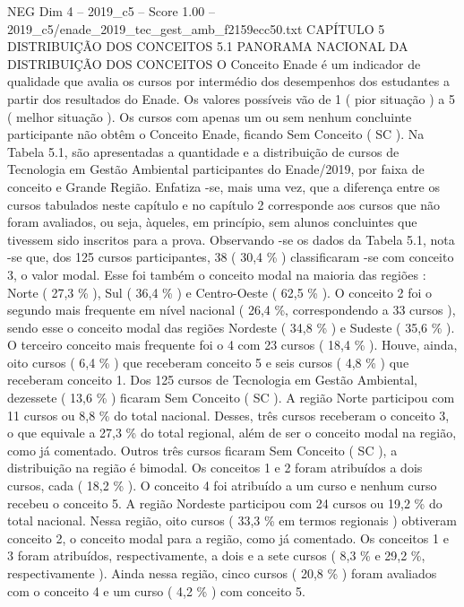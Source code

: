 \begin{textsample}{NEG Dim 4 – 2019\_c5 – Score 1.00 – 2019\_c5/enade\_2019\_tec\_gest\_amb\_f2159ecc50.txt}  \label{ex:f4_neg_159}
CAPÍTULO 5 DISTRIBUIÇÃO DOS CONCEITOS 5.1 PANORAMA NACIONAL DA DISTRIBUIÇÃO DOS CONCEITOS O Conceito Enade é um indicador de qualidade que avalia os cursos por intermédio dos desempenhos dos estudantes a partir dos resultados do Enade.
Os valores possíveis vão de 1 ( pior situação ) a 5 ( melhor situação ).
Os cursos com apenas um ou sem nenhum concluinte participante não obtêm o Conceito Enade, ficando Sem Conceito ( SC ).
Na Tabela 5.1, são apresentadas a quantidade e a distribuição de cursos de Tecnologia em Gestão Ambiental participantes do Enade/2019, por faixa de conceito e Grande Região.
Enfatiza -se, mais uma vez, que a diferença entre os cursos tabulados neste capítulo e no capítulo 2 corresponde aos cursos que não foram avaliados, ou seja, àqueles, em princípio, sem alunos concluintes que tivessem sido inscritos para a prova.
Observando -se os dados da Tabela 5.1, nota -se que, dos 125 cursos participantes, 38 ( 30,4 \% ) classificaram -se com conceito 3, o valor modal.
Esse foi também o conceito modal na maioria das regiões : Norte ( 27,3 \% ), Sul ( 36,4 \% ) e Centro-Oeste ( 62,5 \% ).
O conceito 2 foi o segundo mais frequente em nível nacional ( 26,4 \%, correspondendo a 33 cursos ), sendo esse o conceito modal das regiões Nordeste ( 34,8 \% ) e Sudeste ( 35,6 \% ).
O terceiro conceito mais frequente foi o 4 com 23 cursos ( 18,4 \% ).
Houve, ainda, oito cursos ( 6,4 \% ) que receberam conceito 5 e seis cursos ( 4,8 \% ) que receberam conceito 1.
Dos 125 cursos de Tecnologia em Gestão Ambiental, dezessete ( 13,6 \% ) ficaram Sem Conceito ( SC ).
A região Norte participou com 11 cursos ou 8,8 \% do total nacional.
Desses, três cursos receberam o conceito 3, o que equivale a 27,3 \% do total regional, além de ser o conceito modal na região, como já comentado.
Outros três cursos ficaram Sem Conceito ( SC ), a distribuição na região é bimodal.
Os conceitos 1 e 2 foram atribuídos a dois cursos, cada ( 18,2 \% ).
O conceito 4 foi atribuído a um curso e nenhum curso recebeu o conceito 5.
A região Nordeste participou com 24 cursos ou 19,2 \% do total nacional.
Nessa região, oito cursos ( 33,3 \% em termos regionais ) obtiveram conceito 2, o conceito modal para a região, como já comentado.
Os conceitos 1 e 3 foram atribuídos, respectivamente, a dois e a sete cursos ( 8,3 \% e 29,2 \%, respectivamente ).
Ainda nessa região, cinco cursos ( 20,8 \% ) foram avaliados com o conceito 4 e um curso ( 4,2 \% ) com conceito 5.

\end{textsample}
